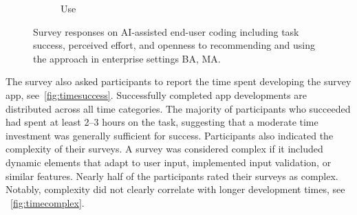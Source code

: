 \documentclass[english,anonymous]{lni}
\begin{document}
\begin{figure}
\begin{subfigure}{0.23\textwidth}
  \caption{Use}
\end{subfigure}
\caption{Survey responses on AI-assisted end-user coding including task success, perceived effort, and openness to recommending and using the approach in enterprise settings 
\protect{} BA, 
\protect{} MA.}\label{fig:outcome}
\end{figure}


The survey also asked participants to report the time spent developing the survey app, see~\cref{fig:timesuccess}. Successfully completed app developments  are distributed across all time categories. The majority of participants who succeeded had spent at least 2--3 hours on the task, suggesting that a moderate time investment was generally sufficient for success.
Participants also indicated the complexity of their surveys.  A survey was considered complex if it included dynamic elements that adapt to user input, implemented input validation, or similar features. Nearly half of the participants rated their surveys as complex. Notably, complexity did not  clearly correlate with longer development times, see ~\cref{fig:timecomplex}.
\end{document}
